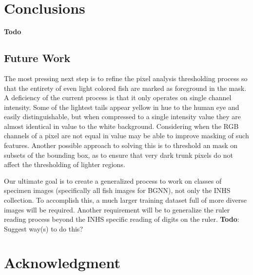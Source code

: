 \documentclass[conference]{IEEEtran}
\begin{document}


\section{Conclusions}
\textbf{Todo}
\subsection{Future Work}
The most pressing next step is to refine the pixel analysis thresholding process so that the entirety of even light colored fish are marked as foreground in the mask. A deficiency of the current process is that it only operates on single channel intensity. Some of the lightest tails appear yellow in hue to the human eye and easily distinguishable, but when compressed to a single intensity value they are almost identical in value to the white background. Considering when the RGB channels of a pixel are not equal in value may be able to improve masking of such features. Another possible approach to solving this is to threshold an mask on subsets of the bounding box, as to ensure that very dark trunk pixels do not affect the thresholding of lighter regions.

Our ultimate goal is to create a generalized process to work on classes of specimen images (specifically all fish images for BGNN), not only the INHS collection. To accomplish this, a much larger training dataset full of more diverse images will be required. Another requirement will be to generalize the ruler reading process beyond the INHS specific reading of digits on the ruler. \textbf{Todo}: Suggest way(s) to do this?

\section*{Acknowledgment}



\end{document}
